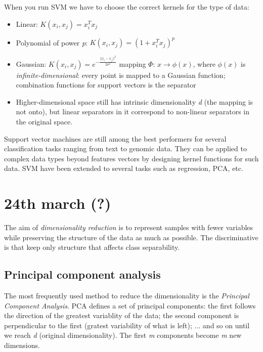 \documentclass{article}
\begin{document}
When you run SVM we have to choose the correct kernels for the type of data:
\begin{itemize}
	\item Linear: \(K(x_i, x_j) = x_i^Tx_j\)
	\item Polynomial of power \emph{p}:  \(K(x_i, x_j) = (1 +x_i^Tx_j)^p\)
	\item Gaussian:  \(K(x_i, x_j) = e^{- \frac{||x_i - x_j||^2}{2 \sigma^2}}\)
		\subitem mapping $\Phi$: \(x \rightarrow \phi(x)\), where $\phi(x)$ is \emph{infinite-dimensional}: every point is mapped to a Gaussian function; combination functions for support vectors is the separator
	\item Higher-dimensional space still has intrinsic dimensionality \emph{d} (the mapping is not onto), but linear separators in it correspond to non-linear separators in the original space.
\end{itemize}


\bigskip

Support vector machines are still among the best performers for several classification tasks ranging from text to genomic data. They can be applied to complex data types beyond features vectors by designing kernel functions for such data. SVM have been extended to several tasks such as regression, PCA, etc.
	










\section*{24th march (?)}

The aim of \emph{dimensionality reduction} is to represent samples with fewer variables while preserving the structure of the data as much as possible. The discriminative is that keep only structure that affects class separability.

\subsection*{Principal component analysis}

The most frequently used method to reduce the dimensionality is the \emph{Principal Component Analysis}. PCA defines a set of principal components: the first follows the direction of the greatest variablity of the data; the second component is perpendicular to the first (gratest variability of what is left); ... and so on until we reach \emph{d} (original dimensionality). The first \emph{m} components become \emph{m} new dimensions.
\end{document}
